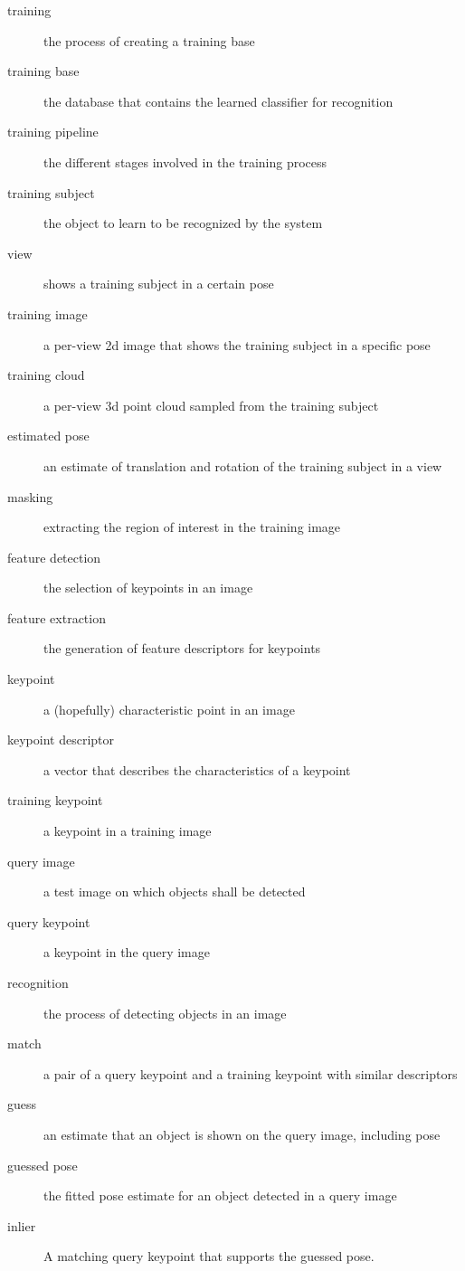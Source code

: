 \begin{description}
    \item[training]the process of creating a training base
    \item[training base] the database that contains the learned classifier for recognition
    \item[training pipeline] the different stages involved in the training process
    \item[training subject] the object to learn to be recognized by the system
    \item[view] shows a training subject in a certain pose
    \item[training image] a per-view 2d image that shows the training subject in a specific pose
    \item[training cloud] a per-view 3d point cloud sampled from the training subject
    \item[estimated pose] an estimate of translation and rotation of the training subject in a view
    \item[masking] extracting the region of interest in the training image
    \item[feature detection] the selection of keypoints in an image
    \item[feature extraction] the generation of feature descriptors for keypoints
    \item[keypoint] a (hopefully) characteristic point in an image
    \item[keypoint descriptor] a vector that describes the characteristics of a keypoint
    \item[training keypoint] a keypoint in a training image
    \item[query image] a test image on which objects shall be detected
    \item[query keypoint] a keypoint in the query image
    \item[recognition] the process of detecting objects in an image
    \item[match] a pair of a query keypoint and a training keypoint with similar descriptors
    \item[guess] an estimate that an object is shown on the query image, including pose
    \item[guessed pose] the fitted pose estimate for an object detected in a query image
    \item[inlier] A matching query keypoint that supports the guessed pose.
\end{description}

